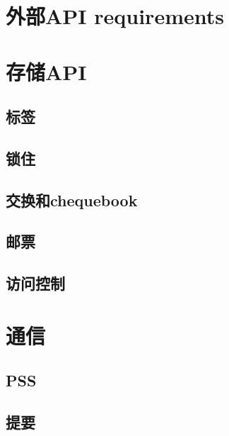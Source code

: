 \section{外部API requirements\statusorange}\label{spec:api:external}



\section{存储API \statusyellow}\label{spec:api:storage}



\subsection{标签\statusyellow}\label{spec:api:tags}


\subsection{锁住
\statusyellow}\label{spec:api:pinning}


\subsection{交换和chequebook\statusorange}\label{spec:api:swap}


\subsection{邮票\statusorange}\label{spec:api:postage}



\subsection{访问控制\statusgreen}\label{spec:api:access-control}




\section{通信\statusorange}\label{spec:api:communications}


\subsection{PSS \statusyellow}\label{spec:api:trojan}



\subsection{提要\statusorange}\label{spec:api:feeds}





